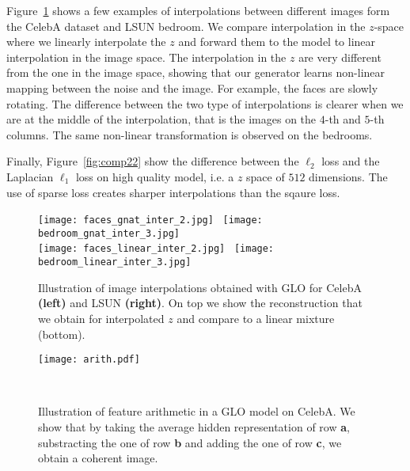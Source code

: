 \documentclass{article}
\newcommand{\GNAT}{GLO}
\begin{document}
Figure~\ref{fig:int} shows a few examples of interpolations between different images form the CelebA dataset and
LSUN bedroom.
We compare interpolation in the $z$-space where we linearly interpolate the $z$ and forward them to the model to
linear interpolation in the image space.
The interpolation in the $z$ are very different from the one in the image space, showing that our generator learns non-linear mapping
between the noise and the image. For example, the faces are slowly rotating. The difference between the two type of interpolations is
clearer when we are at the middle of the interpolation, that is the images on the  $4$-th and $5$-th columns.
The same non-linear transformation is observed on the bedrooms.

Finally, Figure~\ref{fig:comp22} show the difference between the $\ell_2$ loss and the Laplacian $\ell_1$ loss on high quality model, i.e. a $z$ space of $512$ dimensions.
The use of sparse loss creates sharper interpolations than the sqaure loss.

\begin{figure}
  \begin{center}
  \texttt{[image: faces\_gnat\_inter\_2.jpg]} \  \texttt{[image: bedroom\_gnat\_inter\_3.jpg]} \\
  \texttt{[image: faces\_linear\_inter\_2.jpg]} \  \texttt{[image: bedroom\_linear\_inter\_3.jpg]}
  \end{center}
  \caption{
    Illustration of image interpolations obtained with \GNAT{} for CelebA \textbf{(left)} and LSUN \textbf{(right)}.
    On top we show the reconstruction that we obtain for interpolated $z$ and compare to a linear mixture (bottom).
  }\label{fig:int}
\end{figure}

\begin{figure}
  \begin{minipage}[c]{0.5\textwidth}
  \texttt{[image: arith.pdf]}
\end{minipage}~~~~~~
\begin{minipage}[c]{0.45\textwidth}
\caption{
    Illustration of feature arithmetic in a \GNAT{} model on CelebA.
    We show that by taking the average hidden representation of row \textbf{a}, substracting the one of row \textbf{b} and adding the one of row \textbf{c}, we obtain a coherent image.
  \label{fig:arit}}
\end{minipage}
\end{figure}
\end{document}
